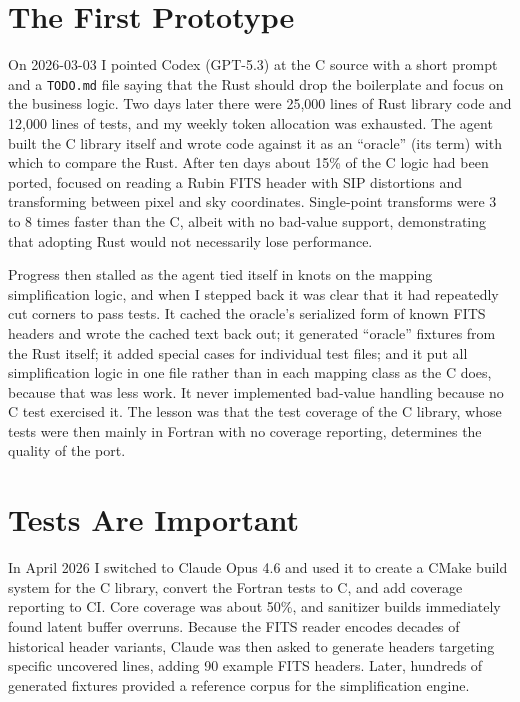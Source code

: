 \section{The First Prototype}

On 2026-03-03 I pointed Codex (GPT-5.3) at the C source with a short prompt and a \texttt{TODO.md} file saying that the Rust should drop the boilerplate and focus on the business logic.
Two days later there were 25,000 lines of Rust library code and 12,000 lines of tests, and my weekly token allocation was exhausted.
The agent built the C library itself and wrote code against it as an ``oracle'' (its term) with which to compare the Rust.
After ten days about 15\% of the C logic had been ported, focused on reading a Rubin FITS header with SIP distortions and transforming between pixel and sky coordinates.
Single-point transforms were 3 to 8 times faster than the C, albeit with no bad-value support, demonstrating that adopting Rust would not necessarily lose performance.

Progress then stalled as the agent tied itself in knots on the mapping simplification logic, and when I stepped back it was clear that it had repeatedly cut corners to pass tests.
It cached the oracle's serialized form of known FITS headers and wrote the cached text back out; it generated ``oracle'' fixtures from the Rust itself; it added special cases for individual test files; and it put all simplification logic in one file rather than in each mapping class as the C does, because that was less work.
It never implemented bad-value handling because no C test exercised it.
The lesson was that the test coverage of the C library, whose tests were then mainly in Fortran with no coverage reporting, determines the quality of the port.

\section{Tests Are Important}

In April 2026 I switched to Claude Opus 4.6 and used it to create a CMake build system for the C library, convert the Fortran tests to C, and add coverage reporting to CI.
Core coverage was about 50\%, and sanitizer builds immediately found latent buffer overruns.
Because the FITS reader encodes decades of historical header variants, Claude was then asked to generate headers targeting specific uncovered lines, adding 90 example FITS headers.
Later, hundreds of generated fixtures provided a reference corpus for the simplification engine.

